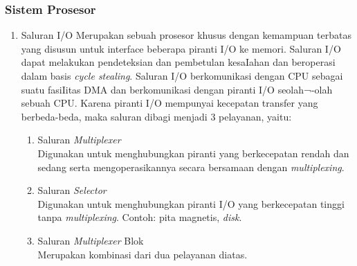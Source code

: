 \documentclass[12pt]{article}
\begin{document}
\subsubsection{Sistem Prosesor}
\begin{enumerate}
    \item {Saluran I/O}
Merupakan sebuah prosesor khusus dengan kemampuan terbatas yang disusun untuk interface beberapa piranti I/O ke memori. Saluran I/O dapat melakukan pendeteksian dan pembetulan kesaIahan dan beroperasi dalam basis \textit{cycle stealing}. Saluran I/O berkomunikasi dengan CPU sebagai suatu fasiIitas DMA dan berkomunikasi dengan piranti I/O seolah¬-olah sebuah CPU. Karena piranti I/O mempunyai kecepatan transfer yang berbeda-beda, maka saluran dibagi menjadi 3 pelayanan, yaitu:
\begin{enumerate}
    \item Saluran \textit{Multiplexer} \\
    Digunakan untuk menghubungkan piranti yang berkecepatan rendah dan sedang serta mengoperasikannya secara bersamaan dengan \textit{multiplexing}.
    \item  Saluran \textit{Selector} \\
    Digunakan untuk menghubungkan piranti I/O yang berkecepatan tinggi tanpa \textit{multiplexing}. Contoh: pita magnetis, \textit{disk}.
    \item Saluran \textit{Multiplexer} Blok \\
    Merupakan kombinasi dari dua pelayanan diatas.
\end{enumerate}
\end{enumerate}
\end{document}
